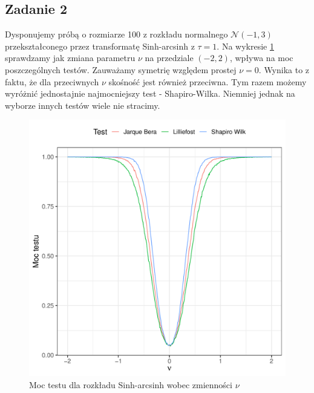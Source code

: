 \documentclass{article}
\theoremstyle{break}
\begin{document}
	\subsection*{Zadanie 2}
	Dysponujemy próbą o rozmiarze 100 z rozkładu normalnego $\mathcal{N}(-1,3)$ przekształconego przez transformatę Sinh-arcsinh z $\tau = 1$. Na wykresie \ref{fig:z2} sprawdzamy jak zmiana parametru $\nu$ na przedziale $(-2,2)$, wpływa na moc poszczególnych testów. Zauważamy symetrię względem prostej $\nu = 0$. Wynika to z faktu, że dla przeciwnych $\nu$ skośność jest również przeciwna. Tym razem możemy wyróżnić jednostajnie najmocniejszy test - Shapiro-Wilka. Niemniej jednak na wyborze innych testów wiele nie stracimy.
	\begin{figure}[H]
		\begin{center}
			\includegraphics[scale=0.75]{zad2.pdf}
			\caption{Moc testu dla rozkładu Sinh-arcsinh wobec zmienności $\nu$}
			\label{fig:z2}
		\end{center}
	\end{figure}
\end{document}

